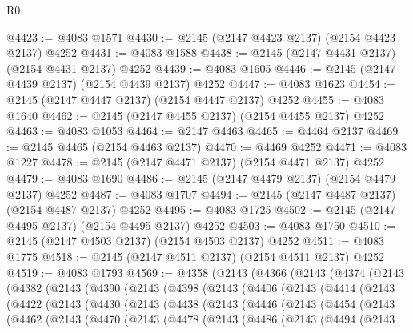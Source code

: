 \begin{lexlean}{R0}
\begin{coremodule}
@4423 := @4083 @1571
@4430 := @2145 (@2147 @4423 @2137) (@2154 @4423 @2137) @4252
@4431 := @4083 @1588
@4438 := @2145 (@2147 @4431 @2137) (@2154 @4431 @2137) @4252
@4439 := @4083 @1605
@4446 := @2145 (@2147 @4439 @2137) (@2154 @4439 @2137) @4252
@4447 := @4083 @1623
@4454 := @2145 (@2147 @4447 @2137) (@2154 @4447 @2137) @4252
@4455 := @4083 @1640
@4462 := @2145 (@2147 @4455 @2137) (@2154 @4455 @2137) @4252
@4463 := @4083 @1053
@4464 := @2147 @4463
@4465 := @4464 @2137
@4469 := @2145 @4465 (@2154 @4463 @2137)
@4470 := @4469 @4252
@4471 := @4083 @1227
@4478 := @2145 (@2147 @4471 @2137) (@2154 @4471 @2137) @4252
@4479 := @4083 @1690
@4486 := @2145 (@2147 @4479 @2137) (@2154 @4479 @2137) @4252
@4487 := @4083 @1707
@4494 := @2145 (@2147 @4487 @2137) (@2154 @4487 @2137) @4252
@4495 := @4083 @1725
@4502 := @2145 (@2147 @4495 @2137) (@2154 @4495 @2137) @4252
@4503 := @4083 @1750
@4510 := @2145 (@2147 @4503 @2137) (@2154 @4503 @2137) @4252
@4511 := @4083 @1775
@4518 := @2145 (@2147 @4511 @2137) (@2154 @4511 @2137) @4252
@4519 := @4083 @1793
@4569 := @4358
    (@2143
      (@4366
        (@2143
          (@4374
            (@2143
              (@4382
                (@2143
                  (@4390
                    (@2143
                      (@4398
                        (@2143
                          (@4406
                            (@2143
                              (@4414
                                (@2143
                                  (@4422
                                    (@2143
                                      (@4430
                                        (@2143
                                          (@4438
                                            (@2143
                                              (@4446
                                                (@2143
                                                  (@4454
                                                    (@2143
                                                      (@4462
                                                        (@2143
                                                          (@4470
                                                            (@2143
                                                              (@4478
                                                                (@2143
                                                                  (@4486
                                                                    (@2143
                                                                      (@4494
                                                                        (@2143

\end{coremodule}
\end{lexlean}
